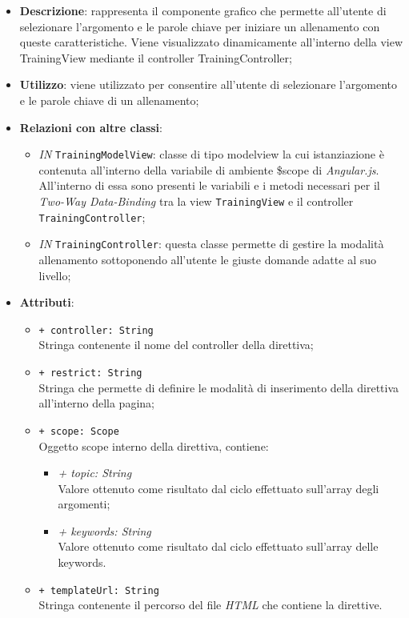 		\begin{itemize}
			\item \textbf{Descrizione}: rappresenta il componente grafico che permette all'utente di selezionare l'argomento e le parole chiave per iniziare un allenamento con queste caratteristiche. Viene visualizzato dinamicamente all'interno della view TrainingView mediante il controller TrainingController;
			\item \textbf{Utilizzo}: viene utilizzato per consentire all'utente di selezionare l'argomento e le parole chiave di un allenamento;
			\item \textbf{Relazioni con altre classi}: 
			\begin{itemize}
				\item \textit{IN} \texttt{TrainingModelView}: classe di tipo modelview la cui istanziazione è contenuta all'interno della variabile di ambiente \$scope di \textit{Angular.js}. All'interno di essa sono presenti le variabili e i metodi necessari per il \textit{Two-Way Data-Binding} tra la view \texttt{TrainingView} e il controller \texttt{TrainingController};  
				\item \textit{IN} \texttt{TrainingController}: questa classe permette di gestire la modalità allenamento sottoponendo all'utente le giuste domande adatte al suo livello;
			\end{itemize}
			\item \textbf{Attributi}: 
			\begin{itemize}
				\item \texttt{+ controller: String} \\ Stringa contenente il nome del controller della direttiva;
				\item \texttt{+ restrict: String} \\ Stringa che permette di definire le modalità di inserimento della direttiva all'interno della pagina;
				\item \texttt{+ scope: Scope} \\ Oggetto scope interno della direttiva, contiene:
				\begin{itemize}
					\item \textit{+ topic: String} \\ Valore ottenuto come risultato dal ciclo effettuato sull'array degli argomenti;
					\item \textit{+ keywords: String} \\ Valore ottenuto come risultato dal ciclo effettuato sull'array delle keywords.
				\end{itemize}
				\item \texttt{+ templateUrl: String} \\ Stringa contenente il percorso del file \textit{HTML} che contiene la direttive.
			\end{itemize}
		\end{itemize}
		
